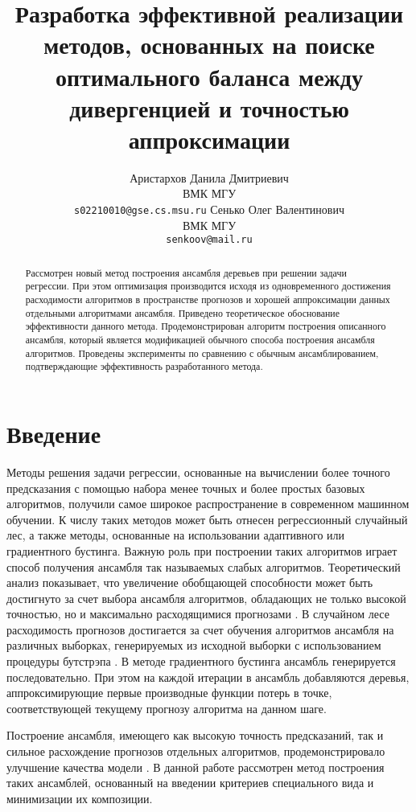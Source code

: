 \documentclass{article}
\title{Разработка эффективной реализации методов, основанных на поиске оптимального баланса между дивергенцией и точностью аппроксимации}
\author{ Аристархов Данила Дмитриевич \\
	ВМК МГУ \\
	\texttt{s02210010@gse.cs.msu.ru}
	\And
	Сенько Олег Валентинович \\
	ВМК МГУ \\
	\texttt{senkoov@mail.ru} \\
}
\date{}
\begin{document}
\maketitle

\begin{abstract}
	Рассмотрен новый метод построения ансамбля деревьев при решении задачи регрессии. При этом оптимизация производится исходя из одновременного достижения расходимости алгоритмов в пространстве прогнозов и хорошей аппроксимации данных отдельными алгоритмами ансамбля. Приведено теоретическое обоснование эффективности данного метода. Продемонстрирован алгоритм построения описанного ансамбля, который является модификацией обычного способа построения ансамбля алгоритмов. Проведены эксперименты по сравнению с обычным ансамблированием, подтверждающие эффективность разработанного метода.
\end{abstract}



\section{Введение}

Методы решения задачи регрессии, основанные на вычислении более точного предсказания с помощью набора менее точных и более простых базовых алгоритмов, получили самое широкое распространение в современном машинном обучении. К числу таких методов может быть отнесен регрессионный случайный лес, а также методы, основанные на использовании адаптивного или градиентного бустинга. Важную роль при построении таких алгоритмов играет способ получения ансамбля так называемых слабых алгоритмов. Теоретический анализ показывает, что увеличение обобщающей способности может быть достигнуто за счет выбора ансамбля алгоритмов, обладающих не только высокой точностью, но и максимально расходящимися прогнозами \citep{convex}. В случайном лесе расходимость прогнозов достигается за счет обучения алгоритмов ансамбля на различных выборках, генерируемых из исходной выборки с использованием процедуры бутстрэпа \citep{bagging}. В методе градиентного бустинга \citep{boosting} ансамбль генерируется последовательно. При этом на каждой итерации в ансамбль добавляются деревья, аппроксимирующие первые производные функции потерь в точке, соответствующей текущему прогнозу алгоритма на данном шаге.

Построение ансамбля, имеющего как высокую точность предсказаний, так и сильное расхождение прогнозов отдельных алгоритмов, продемонстрировало улучшение качества модели \citep{twolevel}. В данной работе рассмотрен метод построения таких ансамблей, основанный на введении критериев специального вида и минимизации их композиции.
\end{document}
